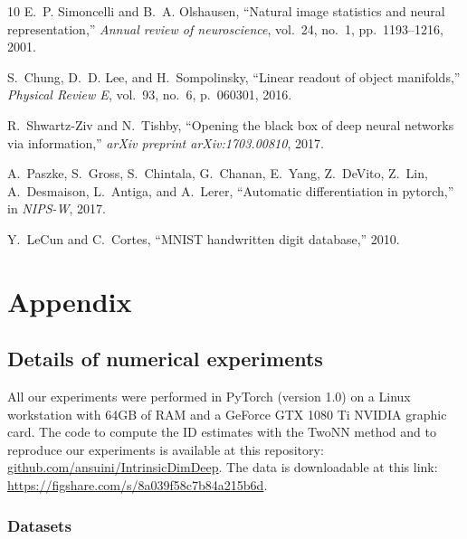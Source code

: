 \documentclass{article}
\begin{document}
\begin{thebibliography}{10}
E.~P. Simoncelli and B.~A. Olshausen, ``Natural image statistics and neural
  representation,'' {\em Annual review of neuroscience}, vol.~24, no.~1,
  pp.~1193--1216, 2001.

S.~Chung, D.~D. Lee, and H.~Sompolinsky, ``Linear readout of object
  manifolds,'' {\em Physical Review E}, vol.~93, no.~6, p.~060301, 2016.

R.~Shwartz-Ziv and N.~Tishby, ``Opening the black box of deep neural networks
  via information,'' {\em arXiv preprint arXiv:1703.00810}, 2017.

A.~Paszke, S.~Gross, S.~Chintala, G.~Chanan, E.~Yang, Z.~DeVito, Z.~Lin,
  A.~Desmaison, L.~Antiga, and A.~Lerer, ``Automatic differentiation in
  pytorch,'' in {\em NIPS-W}, 2017.

Y.~LeCun and C.~Cortes, ``{MNIST} handwritten digit database,'' 2010.

\end{thebibliography}




\clearpage

\appendix

\section{Appendix}

\subsection{Details of numerical experiments}\label{numexp}

All our experiments were performed in PyTorch \cite{paszke2017automatic} (version 1.0) on a Linux workstation with 64GB of RAM and a GeForce GTX 1080 Ti NVIDIA graphic card. 
The code to compute the ID estimates with the TwoNN method and to reproduce our experiments is available at this repository: \href{https://github.com/ansuini/IntrinsicDimDeep}{github.com/ansuini/IntrinsicDimDeep}. The data is downloadable at this link: \href{https://figshare.com/s/8a039f58c7b84a215b6d}{https://figshare.com/s/8a039f58c7b84a215b6d}.

\subsubsection{Datasets}
\end{document}
